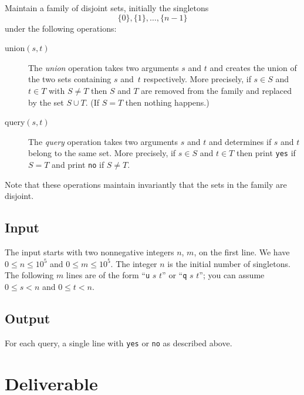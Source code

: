 \documentclass{tufte-handout}
\begin{document}
Maintain a family of disjoint sets, initially the singletons
\[ \{0\},\{1\}, \ldots,\{n-1\} \]
under the following operations:
\begin{description}
  \item[union$(s,t)$]
The \emph{union} operation takes two arguments $s$ and $t$ and creates the union of the two sets containing $s$ and~$t$ respectively.
More precisely, if $s\in S$ and $t\in T$ with $S\neq T$ then $S$ and $T$ are removed from the family and replaced by the set $S\cup T$. 
    (If $S=T$  then nothing happens.)
  \item[query$(s,t)$]
    The \emph{query} operation takes two arguments $s$ and $t$ and determines if $s$ and $t$ belong to the same set.
    More precisely, if $s\in S$ and $t\in T$ then print \texttt{yes} if $S=T$ and print \texttt{no} if $S\neq T$.
\end{description}
Note that these operations maintain invariantly that the sets in the family are disjoint.

\subsection{Input}


The input starts with two nonnegative integers $n$, $m$, on the first line.
We have $0\leq n\leq 10^5$ and $0\leq m\leq 10^5$.
The integer $n$ is the initial number of singletons.
The following $m$ lines are of the form ``\texttt{u} $s$ $t$'' or ``\texttt{q} $s$ $t$''; you can assume $0\leq s< n$ and $0\leq t< n$.

\subsection{Output}


For each query, a single line with \texttt{yes} or \texttt{no} as described above.

\section{Deliverable}
\end{document}
